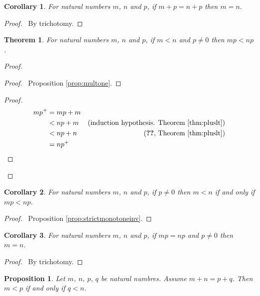 \documentclass{book}
\let\qed\relax
\newtheorem{prop}[ax]{Proposition}
\newtheorem{cor}{Corollary}[ax]
\newtheorem{thm}[ax]{Theorem}
\theoremstyle{definition}
\begin{document}
\begin{cor}
\label{cor:pluscancel}
For natural numbers $m$, $n$ and $p$, if $m + p = n + p$ then $m = n$.
\end{cor}

\begin{proof}
\pf\ By trichotomy. \qed
\end{proof}

\begin{thm}
For natural numbers $m$, $n$ and $p$, if $m < n$ and $p \neq 0$ then $mp < np$.
\end{thm}

\begin{proof}
\pf
{}
\begin{proof}
	\pf\ Proposition \ref{prop:multone}.
\end{proof}
\begin{proof}
	\pf
	\begin{align*}
		mp^+ & = mp + m \\
		& < np + m & (\text{induction hypothesis. Theorem \ref{thm:pluslt}}) \\
		& < np + n & (\text{\stepref{2}, Theorem \ref{thm:pluslt}}) \\
		& = np^+
	\end{align*}
\end{proof}
\qed
\end{proof}

\begin{cor}
For natural numbers $m$, $n$ and $p$, if $p \neq 0$ then $m < n$ if and only if $mp < np$.
\end{cor}

\begin{proof}
	\pf\ Proposition \ref{prop:strictmonotoneinv}. \qed
\end{proof}

\begin{cor}
For natural numbers $m$, $n$ and $p$, if $mp = np$ and $p \neq 0$ then $m = n$.
\end{cor}

\begin{proof}
	\pf\ By trichotomy. \qed
\end{proof}

\begin{prop}
\label{prop:intltlemma}
Let $m$, $n$, $p$, $q$ be natural numbres. Assume $m + n = p + q$. Then $m < p$ if and only if $q < n$.
\end{prop}
\end{document}
